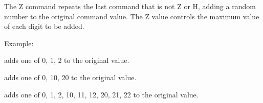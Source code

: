 The Z command repeats the last command that is not Z or H, adding a random number to the original command value. The Z value controls the maximum value of each digit to be added.

\begin{description}
\item Example:
\item[Z02] adds one of 0, 1, 2 to the original value.
\item[Z20] adds one of 0, 10, 20 to the original value.
\item[Z22] adds one of 0, 1, 2, 10, 11, 12, 20, 21, 22 to the original value.
\end{description}
